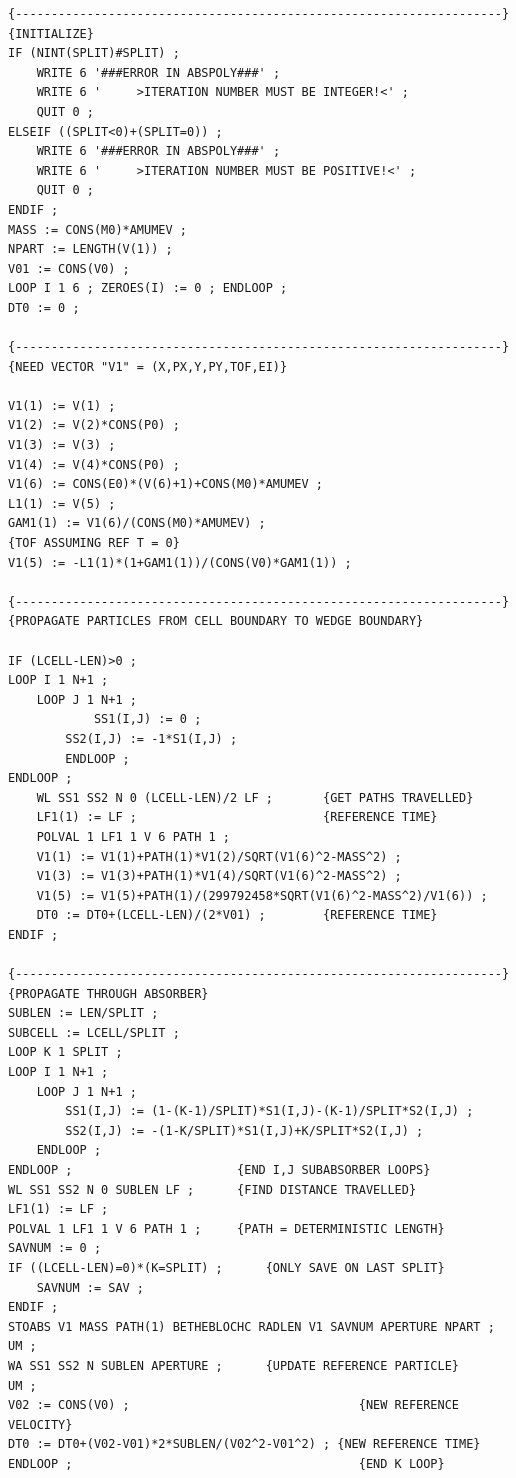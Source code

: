 \begin{lstlisting}
{--------------------------------------------------------------------}
{INITIALIZE}
IF (NINT(SPLIT)#SPLIT) ; 
    WRITE 6 '###ERROR IN ABSPOLY###' ; 
    WRITE 6 '     >ITERATION NUMBER MUST BE INTEGER!<' ;
    QUIT 0 ;
ELSEIF ((SPLIT<0)+(SPLIT=0)) ;
    WRITE 6 '###ERROR IN ABSPOLY###' ; 
    WRITE 6 '     >ITERATION NUMBER MUST BE POSITIVE!<' ;
    QUIT 0 ;
ENDIF ; 
MASS := CONS(M0)*AMUMEV ; 
NPART := LENGTH(V(1)) ; 
V01 := CONS(V0) ;
LOOP I 1 6 ; ZEROES(I) := 0 ; ENDLOOP ; 
DT0 := 0 ;

{--------------------------------------------------------------------}
{NEED VECTOR "V1" = (X,PX,Y,PY,TOF,EI)} 

V1(1) := V(1) ; 
V1(2) := V(2)*CONS(P0) ; 
V1(3) := V(3) ;
V1(4) := V(4)*CONS(P0) ; 
V1(6) := CONS(E0)*(V(6)+1)+CONS(M0)*AMUMEV ;
L1(1) := V(5) ; 
GAM1(1) := V1(6)/(CONS(M0)*AMUMEV) ; 
{TOF ASSUMING REF T = 0} 
V1(5) := -L1(1)*(1+GAM1(1))/(CONS(V0)*GAM1(1)) ;

{--------------------------------------------------------------------}
{PROPAGATE PARTICLES FROM CELL BOUNDARY TO WEDGE BOUNDARY}

IF (LCELL-LEN)>0 ;
LOOP I 1 N+1 ; 
    LOOP J 1 N+1 ;
            SS1(I,J) := 0 ; 
        SS2(I,J) := -1*S1(I,J) ;
        ENDLOOP ; 
ENDLOOP ;
    WL SS1 SS2 N 0 (LCELL-LEN)/2 LF ;       {GET PATHS TRAVELLED} 
    LF1(1) := LF ;                          {REFERENCE TIME}
    POLVAL 1 LF1 1 V 6 PATH 1 ;
    V1(1) := V1(1)+PATH(1)*V1(2)/SQRT(V1(6)^2-MASS^2) ;
    V1(3) := V1(3)+PATH(1)*V1(4)/SQRT(V1(6)^2-MASS^2) ;
    V1(5) := V1(5)+PATH(1)/(299792458*SQRT(V1(6)^2-MASS^2)/V1(6)) ;
    DT0 := DT0+(LCELL-LEN)/(2*V01) ;        {REFERENCE TIME}
ENDIF ;

{--------------------------------------------------------------------}
{PROPAGATE THROUGH ABSORBER}
SUBLEN := LEN/SPLIT ; 
SUBCELL := LCELL/SPLIT ;
LOOP K 1 SPLIT ; 
LOOP I 1 N+1 ;  
    LOOP J 1 N+1 ;
        SS1(I,J) := (1-(K-1)/SPLIT)*S1(I,J)-(K-1)/SPLIT*S2(I,J) ;
        SS2(I,J) := -(1-K/SPLIT)*S1(I,J)+K/SPLIT*S2(I,J) ; 
    ENDLOOP ; 
ENDLOOP ;                       {END I,J SUBABSORBER LOOPS}
WL SS1 SS2 N 0 SUBLEN LF ;      {FIND DISTANCE TRAVELLED}
LF1(1) := LF ; 
POLVAL 1 LF1 1 V 6 PATH 1 ;     {PATH = DETERMINISTIC LENGTH}
SAVNUM := 0 ; 
IF ((LCELL-LEN)=0)*(K=SPLIT) ;      {ONLY SAVE ON LAST SPLIT}
    SAVNUM := SAV ; 
ENDIF ;
STOABS V1 MASS PATH(1) BETHEBLOCHC RADLEN V1 SAVNUM APERTURE NPART ;
UM ;
WA SS1 SS2 N SUBLEN APERTURE ;      {UPDATE REFERENCE PARTICLE}
UM ; 
V02 := CONS(V0) ;                                {NEW REFERENCE VELOCITY}
DT0 := DT0+(V02-V01)*2*SUBLEN/(V02^2-V01^2) ; {NEW REFERENCE TIME}
ENDLOOP ;                                        {END K LOOP}


\end{lstlisting}
